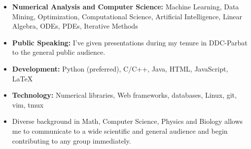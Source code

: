 
    
    \begin{itemize}
    
    \item {\bf Numerical Analysis and Computer Science:} Machine Learning, Data Mining, Optimization, Computational Science, Artificial Intelligence, Linear Algebra, ODEs, PDEs, Iterative Methods
    
    \item {\bf Public Speaking:} I've given presentations during my tenure in DDC-Parbat to the general public audience.
    
    \item {\bf Development:} Python (preferred), C/C++, Java, HTML, JavaScript, \LaTeX
    
    \item {\bf Technology:} Numerical libraries, Web frameworks, databases, Linux, git, vim, tmux
    
    \item Diverse background in Math, Computer Science, Physics and Biology allows me to communicate to a wide scientific and general audience and begin contributing to any group immediately.
    
    \end{itemize}